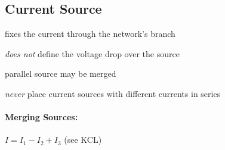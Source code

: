
\subsection{Current Source} %
	
	\begin{tightitemize}
		\item fixes the current through the network's branch
		\item \emph{does not} define the voltage drop over the source
		\item parallel source may be merged
		\item \emph{never} place current sources with different currents in series
	\end{tightitemize}
	
	\paragraph{Merging Sources:} %
		
		$I = I_1 - I_2 + I_3$ \hfill (see KCL)
		\begin{center}
		\end{center}
		
	
